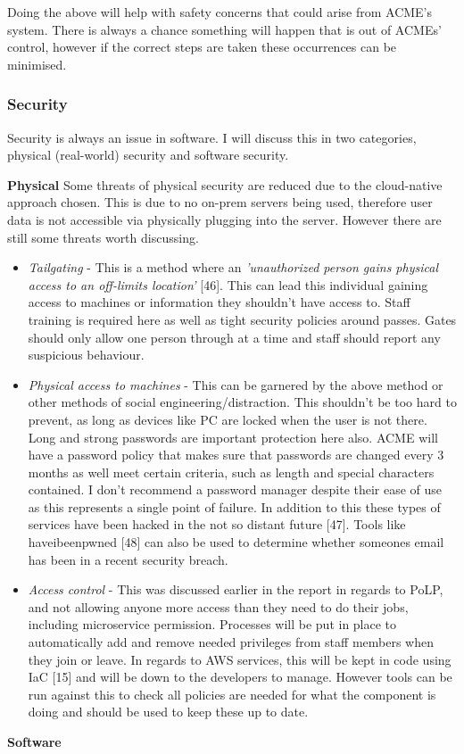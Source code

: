   Doing the above will help with safety concerns that could arise from ACME's system. There is always a chance something will happen that is out of 
  ACMEs' control, however if the correct steps are taken these occurrences can be minimised.

  \subsubsection{Security}
  Security is always an issue in software. I will discuss this in two categories, physical (real-world) security and software security.

  \textbf{Physical}
  \vspace{0.2cm}
  Some threats of physical security are reduced due to the cloud-native approach chosen. This is due to no on-prem servers being used, therefore 
  user data is not accessible via physically plugging into the server. However there are still some threats worth discussing.

  \begin{itemize}
    \item \textit{Tailgating} - This is a method where an \textit{'unauthorized person gains physical access to an off-limits location'} [46]. This can 
    lead this individual gaining access to machines or information they shouldn't have access to. Staff training is required here as well as tight security
    policies around passes. Gates should only allow one person through at a time and staff should report any suspicious behaviour.

    \item \textit{Physical access to machines} - This can be garnered by the above method or other methods of social engineering/distraction. This shouldn't
    be too hard to prevent, as long as devices like PC are locked when the user is not there. Long and strong passwords are important protection here also.
    ACME will have a password policy that makes sure that passwords are changed every 3 months as well meet certain criteria, such as length and special
    characters contained. I don't recommend a password manager despite their ease of use as this represents a single point of failure. In addition to this
    these types of services have been hacked in the not so distant future [47]. Tools like haveibeenpwned [48] can also be used to determine whether someones
    email has been in a recent security breach.

    \item \textit{Access control} - This was discussed earlier in the report in regards to PoLP, and not allowing anyone more access than they need to do 
    their jobs, including microservice permission. Processes will be put in place to automatically add and remove needed privileges from staff members when 
    they join or leave. In regards to AWS services, this will be kept in code using IaC [15] and will be down to the developers to manage. However tools can
    be run against this to check all policies are needed for what the component is doing and should be used to keep these up to date.
    
  \end{itemize}

  \textbf{Software}
  \vspace{0.2cm}


\newpage
